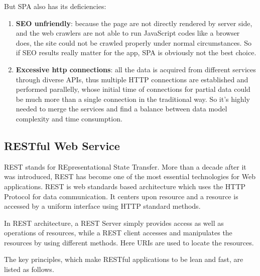 But SPA also has its deficiencies:

\begin{enumerate}
\item
\textbf{\gls{SEO} unfriendly}: because the page are not directly rendered by server side, and the web crawlers are not able to run JavaScript codes like a browser does, the site could not be crawled properly under normal circumstances. So if SEO results really matter for the app, SPA is obviously not the best choice.
\item
\textbf{Excessive http connections}: all the data is acquired from different services through diverse \gls{API}s, thus multiple HTTP connections are established and performed parallelly, whose initial time of connections for partial data could be much more than a single connection in the traditional way. So it's highly needed to merge the services and find a balance between data model complexity and time consumption.
\end{enumerate}


\subsection{RESTful Web Service} \label{sec:tech-rest}
REST stands for REpresentational State Transfer. More than a decade after it was introduced, REST has become one of the most essential technologies for Web applications\cite{richardson2008restful}. REST is web standards based architecture which uses the HTTP Protocol for data communication. It  centers upon resource  and a resource is accessed by a uniform interface using HTTP standard methods.

In REST architecture, a REST Server simply provides access as well as operations of resources, while a  REST client accesses and manipulates the resources by using different methods. Here URIs are used to locate the resources.


The key principles, which make RESTful applications to be lean and fast, are listed as follows\cite{hamad2010performance}.

